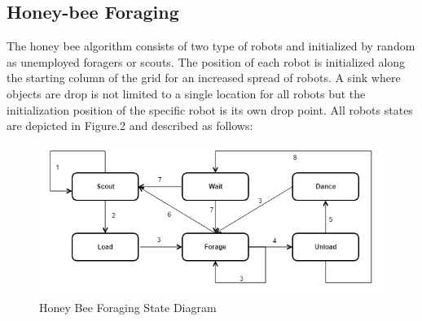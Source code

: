 \documentclass[12pt]{article}
\begin{document}
\subsection{Honey-bee Foraging}

\par{The honey bee algorithm consists of two type of robots and initialized by random as unemployed foragers or scouts. The position of each robot is initialized along the starting column of the grid for an increased spread of robots. A sink where objects are drop is not limited to a single location for all robots but the initialization position of the specific robot is its own drop point. All robots states are depicted in Figure.2 and described as follows:}
\\
\begin{figure}[h]
\includegraphics[width=\textwidth]{honeybee.png}
\centering
\caption{Honey Bee Foraging State Diagram}
\label{fig:honeyBeeState}
\end{figure}
\end{document}
